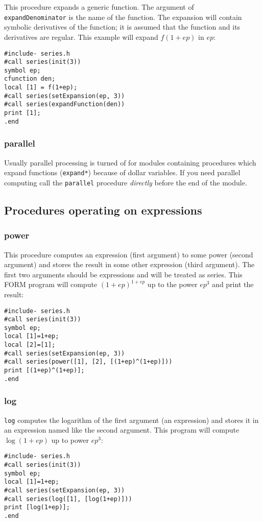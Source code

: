 \documentclass[titlepage]{article}
\begin{document}
This procedure expands a generic function. The argument of {\tt
expandDenominator} is the name of the function. The expansion will
contain symbolic derivatives of the function; it is assumed that the
function and its derivatives are regular.
This example will expand $f(1+ep)$ in $ep$:
\begin{lstlisting}
#include- series.h
#call series(init(3))
symbol ep;
cfunction den;
local [1] = f(1+ep);
#call series(setExpansion(ep, 3))
#call series(expandFunction(den))
print [1];
.end
\end{lstlisting}

\subsubsection{parallel}
\label{sec:parallel}

Usually parallel processing is turned of for modules containing
procedures which expand functions ({\tt expand*}) because of
dollar variables. If you need
parallel computing call the {\tt parallel} procedure {\em directly}
  before the end of the module.

\subsection{Procedures operating on expressions}
\label{sec:proc_expr}

\subsubsection{power}
\label{sec:pow}

This procedure computes an expression (first argument) to some power
(second argument) and stores the result in some other expression (third
argument). The first two arguments should be expressions and will be
treated as series. This FORM program will compute $(1+ep)^{1+ep}$ up to
the power $ep^3$ and print the result:
\begin{lstlisting}
#include- series.h
#call series(init(3))
symbol ep;
local [1]=1+ep;
local [2]=[1];
#call series(setExpansion(ep, 3))
#call series(power([1], [2], [(1+ep)^(1+ep)]))
print [(1+ep)^(1+ep)];
.end
\end{lstlisting}


\subsubsection{log}
\label{sec:log}

{\tt log} computes the logarithm of the first argument (an
expression) and stores it in an expression named like the second
argument. This program will compute $\log (1+ep)$ up to power $ep^3$:
\begin{lstlisting}
#include- series.h
#call series(init(3))
symbol ep;
local [1]=1+ep;
#call series(setExpansion(ep, 3))
#call series(log([1], [log(1+ep)]))
print [log(1+ep)];
.end
\end{lstlisting}
\end{document}
